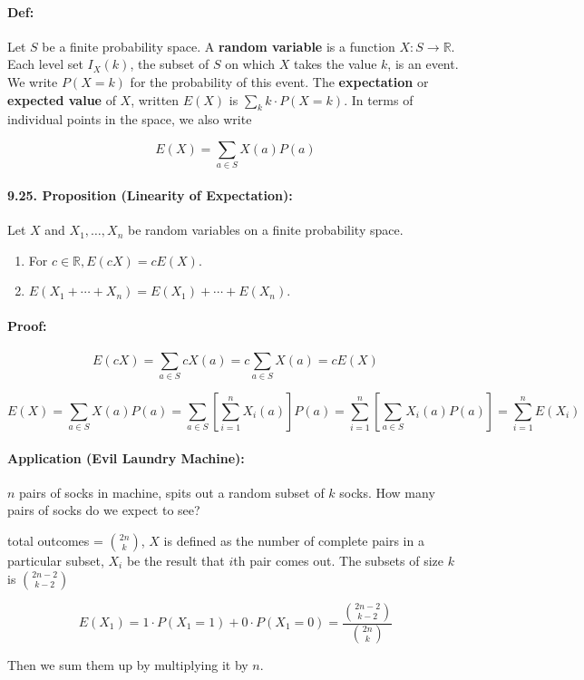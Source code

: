 \documentclass[a4paper, 11pt, twoside]{article}
\begin{document}
\paragraph{Def:} Let $S$ be a finite probability space. A \textbf{random variable} is a function $X:S\rightarrow \mathbb{R}$. Each level set $I_X(k)$, the subset of $S$ on which $X$ takes the value $k$, is an event. We write $P(X=k)$ for the probability of this event. The \textbf{expectation} or \textbf{expected value} of $X$, written $E(X)$ is $\sum_kk\cdot P(X=k)$. In terms of individual points in the space, we also write

\[E(X)=\sum_{a\in S}X(a)P(a)\]

\paragraph{9.25. Proposition (Linearity of Expectation):} Let $X$ and $X_1,\dots, X_n$ be random variables on a finite probability space.
\begin{enumerate}
	\item For $c\in\mathbb{R}, E(cX)=cE(X)$.
	\item $E(X_1+\cdots +X_n)=E(X_1)+\cdots +E(X_n)$.
\end{enumerate} 

\paragraph{Proof:}

\[E(cX)=\sum_{a\in S}cX(a)=c\sum_{a\in S}X(a)=cE(X)\]

\[E(X)=\sum_{a\in S}X(a)P(a)=\sum_{a\in S}\left[\sum^n_{i=1}X_i(a)\right]P(a)=\sum^n_{i=1}\left[\sum_{a\in S}X_i(a)P(a)\right]=\sum^n_{i=1}E(X_i)\]

\paragraph{Application (Evil Laundry Machine):} $n$ pairs of socks in machine, spits out a random subset of $k$ socks. How many pairs of socks do we expect to see?

total outcomes = ${2n \choose k}$, $X$ is defined as the number of complete pairs in a particular subset, $X_i$ be the result that $i$th pair comes out. The subsets of size $k$ is ${2n-2 \choose k-2}$

\[E(X_1)=1\cdot P(X_1=1)+0\cdot P(X_1=0) = \frac{{2n-2\choose k-2}}{{2n\choose k}}\]

Then we sum them up by multiplying it by $n$.
\end{document}
